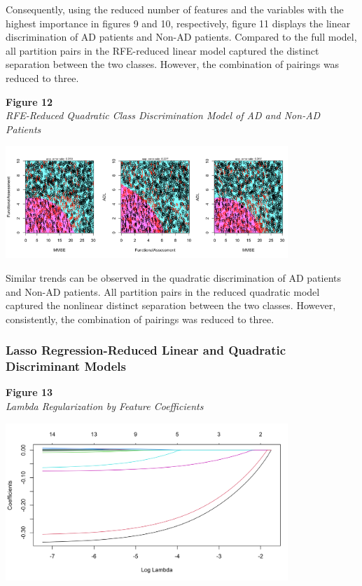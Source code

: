 \documentclass[12pt]{article}
\begin{document}
Consequently, using the reduced number of features and the variables with the highest importance in figures 9 and 10, respectively, figure 11 displays the linear discrimination of AD patients and Non-AD patients. Compared to the full model, all partition pairs in the RFE-reduced linear model 
captured the distinct separation between the two classes. However, the combination of pairings was reduced to three. 

\noindent
\textbf{Figure 12} \\ 
\textit{RFE-Reduced Quadratic Class Discrimination Model of AD and Non-AD Patients}
\begin{center}
    \includegraphics[width = 0.8\textwidth]{QDA_RFE.png}
\end{center}

Similar trends can be observed in the quadratic discrimination of AD patients and Non-AD patients. All partition pairs in the reduced quadratic model captured the nonlinear distinct separation between the two classes. However, consistently, the combination of pairings was reduced to three. 

\subsubsection{Lasso Regression-Reduced Linear and Quadratic Discriminant Models}
\textbf{Figure 13} \\ 
\textit{Lambda Regularization by Feature Coefficients}
\begin{center}
    \includegraphics[width = 0.8\textwidth]{Coefficient vs Log Lambda.png}
\end{center}
\end{document}

